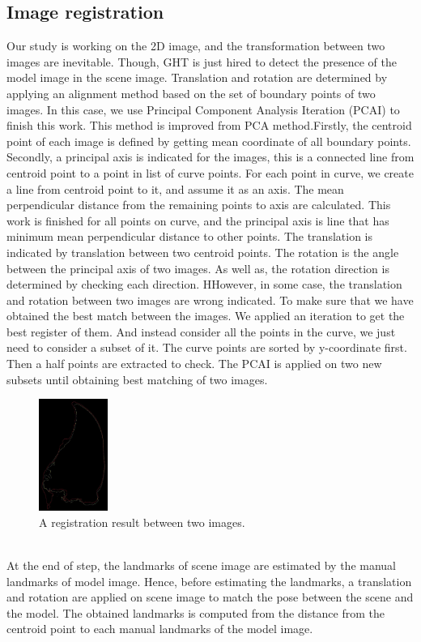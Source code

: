 \documentclass[twoside,twocolumn,10pt]{article}
\begin{document}
\subsection{Image registration}
Our study is working on the 2D image, and the transformation between two images are inevitable. Though, GHT is just hired to detect the presence of the model image in the scene image. Translation and rotation are determined by applying an alignment method based on the set of boundary points of two images. In this case, we use Principal Component Analysis Iteration (PCAI) to finish this work. This method is improved from PCA method\cite{pca}.Firstly, the centroid point of each image is defined by getting mean coordinate of all boundary points. Secondly, a principal axis is indicated for the images, this is a connected line from centroid point to a point in list of curve points. For each point in curve, we create a line from centroid point to it, and assume it as an axis. The mean perpendicular distance from the remaining points to axis are calculated. This work is finished for all points on curve, and the principal axis is line that has minimum mean perpendicular distance to other points. The translation is indicated by translation between two centroid points. The rotation is the angle between the principal axis of two images. As well as, the rotation direction is determined by checking each direction. HHowever, in some case, the translation and rotation between two images are wrong indicated. To make sure that we have obtained the best match between the images. We applied an iteration to get the best register of them. And instead consider all the points in the curve, we just need to consider a subset of it. The curve points are sorted by y-coordinate first. Then a half points are extracted to check. The PCAI is applied on two new subsets until obtaining best matching of two images.
\begin{figure}[htb]
    \centering
    \includegraphics[width=0.2\textwidth]{./images/imreg}
    \caption{A registration result between two images.}
    \label{fig:box}
\end{figure}~\\
At the end of step, the landmarks of scene image are estimated by the manual landmarks of model image. Hence, before estimating the landmarks, a translation and rotation are applied on scene image to match the pose between the scene and the model. The obtained landmarks is computed from the distance from the centroid point to each manual landmarks of the model image.
\end{document}
